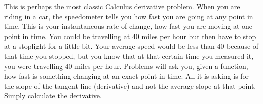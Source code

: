 \documentclass[../revisedmain.tex]{subfiles}
\begin{document}
	This is perhaps the most classic Calculus derivative problem. When you are riding in a car, the speedometer tells you how fast you are going at any point in time. This is your instantaneous rate of change, how fast you are moving at one point in time. You could be travelling at 40 miles per hour but then have to stop at a stoplight for a little bit. Your average speed would be less than 40 because of that time you stopped, but you know that at that certain time you measured it, you were travelling 40 miles per hour. Problems will ask you, given a function, how fast is something changing at an exact point in time. All it is asking is for the slope of the tangent line (derivative) and not the average slope at that point. Simply calculate the derivative.
\end{document}
